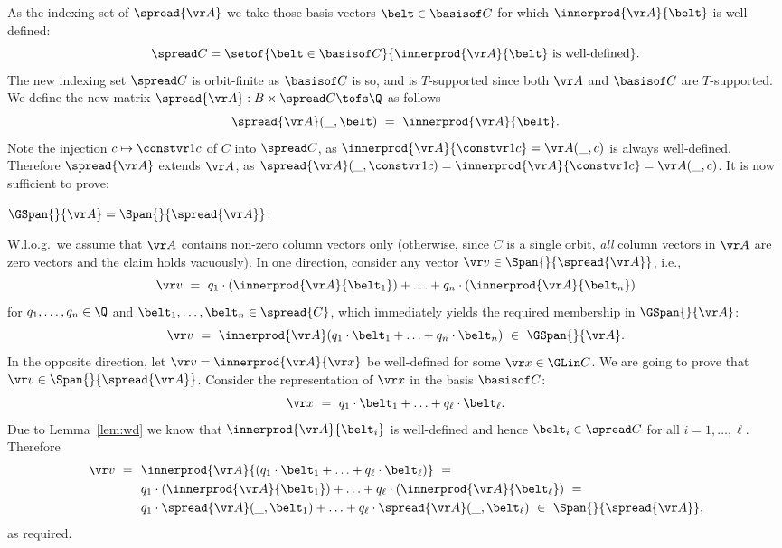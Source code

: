 As the indexing set of $\spread {\vr A}$ we take those basis vectors $\belt \in \basisof C$ for which
$\innerprod {\vr A} {\belt}$
is well defined: 
\[
\spread C = \setof{\belt \in \basisof C}{\innerprod {\vr A} {\belt} \text{ is well-defined}}.
\]
The new indexing set $\spread C$ is orbit-finite as $\basisof C$ is so, and is $T$-supported
since both $\vr A$ and $\basisof C$ are  $T$-supported.
We define the new matrix $\spread{\vr A} : B \times \spread C \tofs \Q$ as follows
\[
\spread {\vr A}(\_, \belt) \ = \ \innerprod {\vr A} {\belt}.
\]
Note the injection $c\mapsto \constvr 1 c$ of $C$ into $\spread C$, as $\innerprod {\vr A}{\constvr 1 c} = \vr A(\_, c)$ is always 
well-defined.
Therefore $\spread {\vr A}$ extends $\vr A$, as $\spread{\vr A}(\_, \constvr 1 c) = 
\innerprod {\vr A}{\constvr 1 c} = \vr A(\_, c)$.
It is now sufficient to prove:
%
\begin{claim} \label{lem:SS}
$\GSpan {} {\vr A} = \Span {} {\spread{\vr A}}$.
\end{claim}
%
\begin{claimproof}
W.l.o.g.~we assume that $\vr A$ contains non-zero column vectors only
(otherwise, since $C$ is a single orbit, 
\emph{all} column vectors in $\vr A$ are zero vectors and the claim holds vacuously).
%
In one direction, consider any vector $\vr v \in \Span {} {\spread{\vr A}}$, i.e.,
\[
\vr v \ = \ q_1 \cdot (\innerprod{\vr A} {\belt_1}) + \ldots + q_n \cdot (\innerprod {\vr A} {\belt_n})
\]
for $q_1, \ldots, q_n\in \Q$ and $\belt_1, \ldots, \belt_n \in \spread {C}$, which immediately
yields the required membership in $\GSpan {} {\vr A}$:
\[
\vr v \ = \ \innerprod {\vr A} (q_1 \cdot \belt_1 + \ldots + q_n \cdot \belt_n) \ \in \ \GSpan {} {\vr A}.
\]
In the opposite direction, let $\vr v = \innerprod {\vr A} {\vr x}$ be well-defined for some $\vr x \in \GLin C$.
We are going to prove that $\vr v \in \Span {}{\spread{\vr A}}$.
Consider the representation of $\vr x$ in the basis $\basisof C$:
\[
\vr x \ = \ q_1 \cdot \belt_1 + \ldots + q_\ell \cdot \belt_\ell.
\]
Due to Lemma~\ref{lem:wd} we know that $\innerprod {\vr A} {\belt_i}$ is well-defined
and hence $\belt_i \in \spread C$
for all $i=1,\ldots, \ell$.
Therefore
\begin{align*}
\vr v \ = \ \ & \innerprod {\vr A} {(q_1 \cdot \belt_1 + \ldots + q_\ell \cdot \belt_\ell)} \ = \ \\
& q_1 \cdot (\innerprod {\vr A}{\belt_1}) + \ldots + q_\ell \cdot (\innerprod {\vr A}{\belt_\ell}) \ = \ \\ 
& q_1 \cdot \spread{\vr A}(\_, \belt_1) + \ldots + q_\ell \cdot \spread{\vr A}(\_, \belt_\ell) \ \in \ \Span {} {\spread{\vr A}},
\end{align*}
as required.
\end{claimproof}

